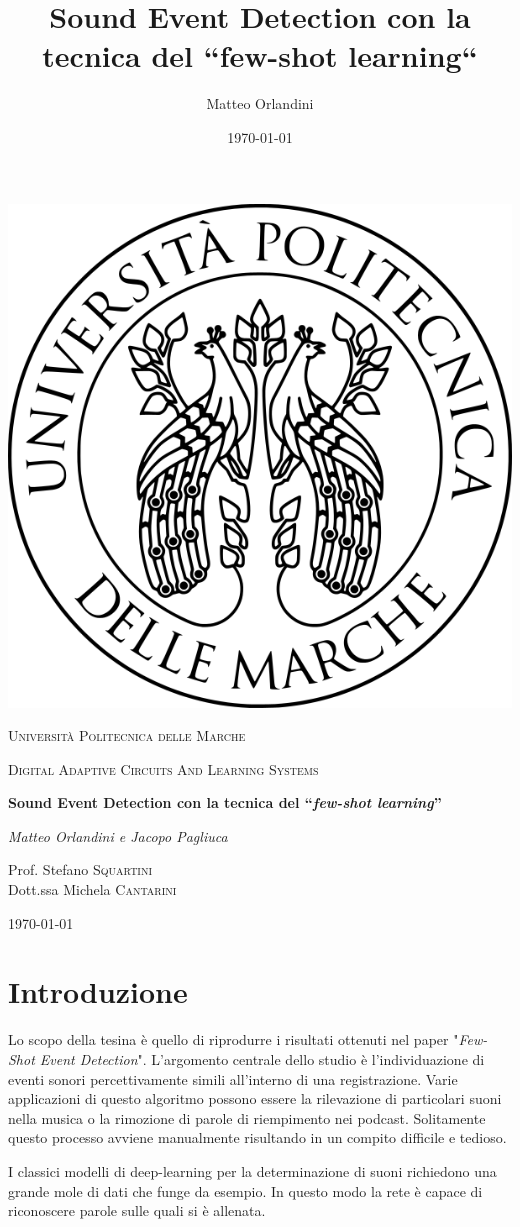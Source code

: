 \documentclass[12pt,a4paper,titlepage]{article}
\title{Sound Event Detection con la tecnica del “few-shot learning“}
\author{Matteo Orlandini}
\date{\today}
\begin{document}
\begin{titlepage}
	
	\centering
	\includegraphics[width=.2\textwidth]{Immagini/univpmlogo}\par\vspace{1cm}
	{\scshape\LARGE Università Politecnica delle Marche\par}
	\vspace{1cm}
	{\scshape\Large Digital Adaptive Circuits And Learning Systems\par}
	\vspace{1.5cm}
	{\huge\bfseries Sound Event Detection con la tecnica del  ``\emph{few-shot learning}''  \par}
	\vspace{2cm}
	{\Large\itshape Matteo Orlandini e Jacopo Pagliuca\par}
	\vfill
	Prof. Stefano \textsc{Squartini}\\
	Dott.ssa Michela \textsc{Cantarini}
	
	\vfill
	
	{\large \today\par}
\end{titlepage}

\thispagestyle{empty}
\tableofcontents
\clearpage

\setcounter{page}{1}

\section{Introduzione}
\label{section:Introduzione}
Lo scopo della tesina è quello di riprodurre i risultati ottenuti nel paper "\textit{Few-Shot Event Detection}"\cite{Salamon:Few-Shot}. 
L'argomento centrale dello studio è l'individuazione di eventi sonori percettivamente simili all'interno di una registrazione.
Varie applicazioni di questo algoritmo possono essere la rilevazione di particolari suoni nella musica o la rimozione di parole di riempimento nei podcast.
Solitamente questo processo avviene manualmente risultando in un compito difficile e tedioso.

I classici modelli di deep-learning per la determinazione di suoni richiedono una grande mole di dati che funge da esempio. In questo modo la rete è capace di riconoscere parole sulle quali si è allenata.
\end{document}
